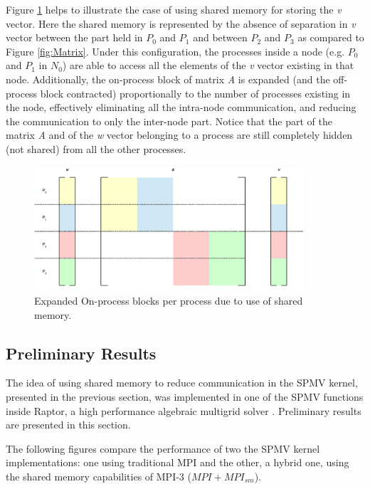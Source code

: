 \medskip

Figure \ref{fig:MatrixSm} helps to illustrate the case of using shared memory for storing the \emph{v} vector. Here the shared memory is represented by the absence of separation in \emph{v} vector between the part held in $P_0$ and $P_1$ and between $P_2$ and $P_3$ as compared to Figure \ref{fig:Matrix}. Under this configuration, the processes inside a node (e.g. $P_0$ and $P_1$ in $N_0$) are able to access all the elements of the \emph{v} vector existing in that node. Additionally, the on-process block of matrix \emph{A} is expanded (and the off-process block contracted) proportionally to the number of processes existing in the node, effectively eliminating all the intra-node communication, and reducing the communication to only the inter-node part. Notice that the part of the matrix \emph{A} and of the \emph{w} vector belonging to a process are still completely hidden (not shared) from all the other processes.



\begin{figure}[t!]
    \centering
    \includegraphics[width=100mm]{Plots/HybridProgramming/matrixSm.png}
    \caption{Expanded On-process blocks per process due to use of shared memory.}
    \label{fig:MatrixSm}
\end{figure}


\subsection*{Preliminary Results}


The idea of using shared memory to reduce communication in the SPMV kernel, presented in the previous section,
was implemented in one of the SPMV functions inside Raptor, a high performance algebraic multigrid solver \cite{BiOl2017}. Preliminary results are presented in this section. 

\medskip

The following figures compare the performance of two the SPMV kernel implementations: one using traditional MPI and the other, a hybrid one, using the shared memory capabilities of MPI-3 ($MPI+MPI_{sm}$).

